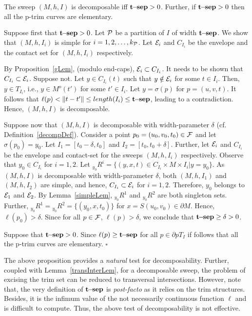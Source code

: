 \documentclass{elsart5p}
\newcommand{\eat}[1]{}
\newcommand{\sep}{{\bf t\!\!-\!\!sep}}
\begin{document}
\begin{prop} \label{decompLem}
The sweep $(M,h,I)$ is decomposable iff $\sep > 0$. Further, if $\sep > 0$ 
then all the p-trim curves are elementary.
\end{prop}
 Suppose first that $\sep > 0$.  Let ${\cal P}$ be a partition of $I$ of width 
$\sep$.  We show that $(M,h,I_i)$ is simple for $i = 1,2,\ldots, k_{\cal P}$. 
Let ${\cal E}_i$ and $C_{I_i}$ be the envelope and the contact set for $(M,h,I_i)$ respectively.
\eat{
and $R^i$ be the correspondence for $(M,h,I_i)$ ,i.e., 
$R^i := \{ (y,x,t) \in  C_{I_i} \times M \times I_i | y = A(t) \cdot x + b(t) \}$. Further, we set $R^i_{t_0} := \{(y,x,t) \in R^i | t = t_0 \}$.}
By Proposition~\ref{gLem}, (modulo end-caps), ${\cal E}_i \subset C_{I_i}$. 
It needs to be shown that $C_{I_i} \subset {\cal E}_i$.  
Suppose not.  Let $y \in C_{I_i}(t)$ such that 
$y \notin {\cal E}_i$ for some $t \in I_i$.  Then, $y \in T_{I_i}$, i.e.,  $y \in M^o(t')$ for some $t' \in I_i$.  Let $y = \sigma(p)$ for $p = (u,v,t)$.  It follows that $\ell(p) < \|t - t' \| \leq length(I_i) \leq \sep$,  leading to a contradiction.
Hence, $(M,h,I)$ is decomposable.

Suppose now that $(M,h,I)$ is decomposable with width-parameter $\delta$ 
(cf. Definition~\ref{decompDef}).
Consider a point $p_0= (u_0, v_0, t_0) \in {\cal F}$ and 
let $\sigma(p_0) = y_0$.  
Let $I_1 = [t_0 - \delta, t_0]$ and $I_2 = [t_0, t_0 + \delta]$. Further,
let ${\cal E}_i$ and $C_{I_i}$ be the envelope and contact-set for the
sweeps $(M,h,I_i)$ respectively. Observe that 
$y_0 \in C_{I_i}$ for $i=1,2$.
Let ${_{y_0}}R^i = \{ (y,x,t) \in C_{I_i} \times M \times I_i| y = y_0 \}$.
As $(M,h,I)$ is decomposable with width-parameter $\delta$,
both $(M,h,I_1)$ and $(M,h,I_2)$ are simple, and hence,
$C_{I_i} \subset {\cal E}_i$ for $i=1,2$. Therefore, 
$y_0$ belongs to  ${\cal E}_1$ and ${\cal E}_2$.
By Lemma~\ref{simpleLem}, 
${_{y_0}}R^1$ and ${_{y_0}}R^2$ are both singleton sets.  
Further, ${_{y_0}}R^1 = {_{y_0}}R^2 = \{ (y_0,x,t_0) \}$ for 
$x=S(u_0,v_0) \in \partial M$.  Hence, $\ell(p_0) > \delta$.  Since for all $p \in {\cal F}$,
$\ell(p) > \delta$, we conclude that $\sep \geq \delta >0$.

Suppose that $\sep > 0$.  Since $\ell(p) \geq \sep$ for all 
$p \in \partial pT_I$ 
if follows that all the p-trim curves are elementary.
\hfill $\square$


The above proposition provides a {\em natural} test for decomposability. Further, coupled
with Lemma~\ref{transInterLem}, for a decomposable sweep, the problem of
excising the trim set can be reduced to transversal intersections. However,
note that, the very definition of $\sep$ is {\em post-facto} as it 
relies on the trim structures.
Besides, it is the infimum value of the 
not necessarily continuous function $\ell$ and is difficult to compute. Thus, 
the above test of decomposability is not effective.
\end{document}
